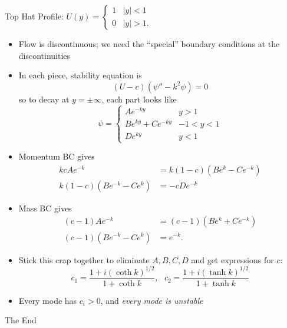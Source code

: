 \documentclass[landscape]{seminar}
\begin{document}
\begin{slide}

\begin{center}Top Hat Profile: $U(y) = \begin{cases} 1 & \vert y \vert < 1 \\ 0 & \vert y \vert > 1. \end{cases}$\end{center}

\begin{itemize}
  \item Flow is discontinuous; we need the ``special'' boundary conditions at the discontinuities

  \item In each piece, stability equation is
\begin{equation*}
(U - c) (\psi'' - k^2 \psi) = 0
\end{equation*}
so to decay at $y = \pm \infty$, each part looks like
\begin{equation*}
\psi =
\begin{cases}
A e^{-ky} & y > 1 \\
B e^{ky} + C e^{-ky} & -1 < y < 1 \\
D e^{ky} & y < 1
\end{cases}
\end{equation*}

\end{itemize}

\end{slide}
\begin{slide}

\begin{itemize}
  \item Momentum BC gives
\begin{align*}
kc A e^{-k} &= k(1-c) \left(B e^{k} - C e^{-k}\right) \\
k(1-c) \left(B e^{-k} - C e^{k}\right) &= -cD e^{-k}
\end{align*}

  \item Mass BC gives
\begin{align*}
(c-1) A e^{-k} &= (c-1) \left(B e^{k} + C e^{-k}\right) \\
(c-1) \left(B e^{-k} - C e^{k}\right) &=  e^{-k}.
\end{align*}

  \item Stick this crap together to eliminate $A, B, C, D$ and get expressions for $c$:
\begin{equation*}
c_1 = \frac{1 + i (\coth k)^{1/2}}{1 + \coth k}, \ \ \ c_2 = \frac{1 + i (\tanh k)^{1/2}}{1 + \tanh k}
\end{equation*}

\item Every mode has $c_i > 0$, and \emph{every mode is unstable}

\end{itemize}

\end{slide}
\begin{slide}

The End

\end{slide}
\end{document}
